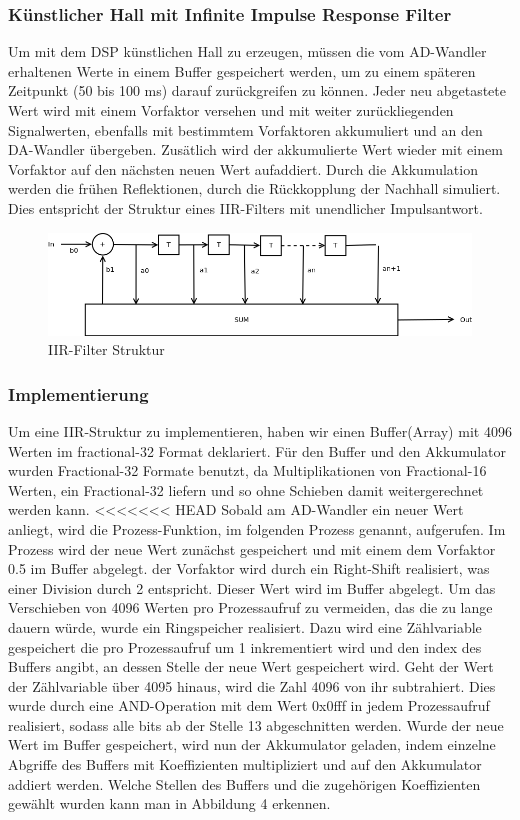 \documentclass[a4paper,12pt,fontsize=12,DIV=12]{scrartcl}
\begin{document}
\subsubsection{Künstlicher Hall mit Infinite Impulse Response Filter}
Um mit dem DSP künstlichen Hall zu erzeugen, müssen die vom AD-Wandler erhaltenen Werte in einem Buffer gespeichert werden, um zu einem späteren Zeitpunkt (50 bis 100 ms) darauf zurückgreifen zu können. Jeder neu abgetastete Wert wird mit einem Vorfaktor versehen und mit weiter zurückliegenden Signalwerten, ebenfalls mit bestimmtem Vorfaktoren akkumuliert und an den DA-Wandler übergeben. Zusätlich wird der akkumulierte Wert wieder mit einem Vorfaktor auf den nächsten neuen Wert aufaddiert. Durch die Akkumulation werden die frühen Reflektionen, durch die Rückkopplung der Nachhall simuliert. 
Dies entspricht der Struktur eines IIR-Filters mit unendlicher Impulsantwort.
\begin{figure}[h]
	\includegraphics[scale=0.5]{Bilder/iir.png}
	\caption{IIR-Filter Struktur}
	\label{labelnameIIR-Filter Struktur}
\end{figure}

\subsubsection{Implementierung}
Um eine IIR-Struktur zu implementieren, haben wir einen Buffer(Array) mit 4096 Werten im fractional-32 Format deklariert. Für den Buffer und den Akkumulator wurden Fractional-32 Formate benutzt, da Multiplikationen von Fractional-16 Werten, ein Fractional-32 liefern und so ohne Schieben damit weitergerechnet werden kann.
<<<<<<< HEAD
Sobald am AD-Wandler ein neuer Wert anliegt, wird die Prozess-Funktion, im folgenden Prozess genannt, aufgerufen. Im Prozess wird der neue Wert zunächst gespeichert und mit einem dem Vorfaktor 0.5 im Buffer abgelegt. der Vorfaktor wird durch ein Right-Shift realisiert, was einer Division durch 2 entspricht.
Dieser Wert wird im Buffer abgelegt. Um das Verschieben von 4096 Werten pro Prozessaufruf zu vermeiden, das die zu lange dauern würde, wurde ein Ringspeicher realisiert. Dazu wird eine Zählvariable gespeichert die pro Prozessaufruf um 1 inkrementiert wird und den index des Buffers angibt, an dessen Stelle der neue Wert gespeichert wird. Geht der Wert der  Zählvariable über 4095 hinaus, wird die Zahl 4096 von ihr subtrahiert. Dies wurde durch eine AND-Operation mit dem Wert 0x0fff in jedem Prozessaufruf realisiert, sodass alle bits ab der Stelle 13 abgeschnitten werden.
Wurde der neue Wert im Buffer gespeichert, wird nun der Akkumulator geladen, indem einzelne Abgriffe des Buffers mit Koeffizienten multipliziert und auf den Akkumulator addiert werden. Welche Stellen des Buffers und die zugehörigen Koeffizienten gewählt wurden kann man in Abbildung 4 erkennen.
\newpage
\end{document}
